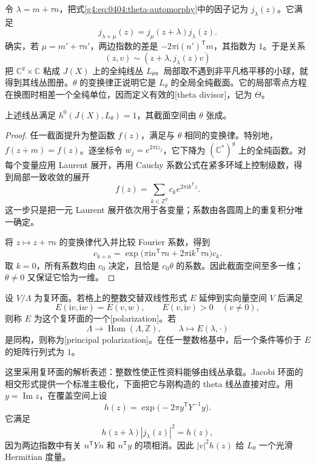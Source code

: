 令 \(\lambda=m+\tau n\)，把式\eqref{g4:eq:0404:theta-automorphy}中的因子记为 \(j_\lambda(z)\)。它满足
\[
	j_{\lambda+\mu}(z)=j_\mu(z+\lambda)j_\lambda(z).
\]
确实，若 \(\mu=m'+\tau n'\)，两边指数的差是 \(-2\pi\mathrm{i}(n')^{\mathsf T}m\)，其指数为 \(1\)。于是关系
\[
	(z,v)\sim(z+\lambda,j_\lambda(z)v)
\]
把 \(\mathbb C^g\times\mathbb C\) 粘成 \(J(X)\) 上的全纯线丛 \(L_\theta\)。局部取不遇到非平凡格平移的小球，就得到其线丛图册。\(\theta\) 的变换律正说明它是 \(L_\theta\) 的全局全纯截面。它的局部零点方程在换图时相差一个全纯单位，因而定义有效的[theta divisor]，记为 \(\Theta\)。

\begin{proposition}
	\label{g4:prop:0404:theta-section-dimension}
	上述线丛满足 \(h^0(J(X),L_\theta)=1\)，其截面空间由 \(\theta\) 张成。
\end{proposition}
\begin{proof}
	任一截面提升为整函数 \(f(z)\)，满足与 \(\theta\) 相同的变换律。特别地，\(f(z+m)=f(z)\)。逐坐标令 \(w_j=e^{2\pi\mathrm{i}z_j}\)，它下降为 \((\mathbb C^*)^g\) 上的全纯函数。对每个变量应用 Laurent 展开，再用 Cauchy 系数公式在紧多环域上控制级数，得到局部一致收敛的展开
	\[
		f(z)=\sum_{k\in\mathbb Z^g}c_k e^{2\pi\mathrm{i}k^{\mathsf T}z}.
	\]
	这一步只是把一元 Laurent 展开依次用于各变量；系数由各圆周上的重复积分唯一确定。

	将 \(z\mapsto z+\tau n\) 的变换律代入并比较 Fourier 系数，得到
	\[
		c_{k+n}=\exp\bigl(\pi\mathrm{i}n^{\mathsf T}\tau n
		+2\pi\mathrm{i}k^{\mathsf T}\tau n\bigr)c_k.
	\]
	取 \(k=0\)，所有系数均由 \(c_0\) 决定，且恰是 \(c_0\theta\) 的系数。因此截面空间至多一维；\(\theta\ne0\) 又保证它恰为一维。
\end{proof}

\begin{definition}
	\label{g4:def:0404:principal-polarization}
	设 \(V/\Lambda\) 为复环面。若格上的整数交替双线性形式 \(E\) 延伸到实向量空间 \(V\) 后满足
	\[
		E(\mathrm{i}v,\mathrm{i}w)=E(v,w),\qquad
		E(v,\mathrm{i}v)>0\quad(v\ne0),
	\]
	则称 \(E\) 为这个复环面的一个[polarization]。若
	\[
		\Lambda\longrightarrow\operatorname{Hom}(\Lambda,\mathbb Z),\qquad
		\lambda\longmapsto E(\lambda,\cdot)
	\]
	是同构，则称为[principal polarization]。在任一整数格基中，后一个条件等价于 \(E\) 的矩阵行列式为 \(1\)。
\end{definition}

这里采用复环面的解析表述：整数性使正性资料能够由线丛承载。Jacobi 环面的相交形式提供一个标准主极化，下面把它与刚构造的 theta 线丛直接对应。用 \(y=\operatorname{Im}z\)，在覆盖空间上设
\[
	h(z)=\exp\bigl(-2\pi y^{\mathsf T}Y^{-1}y\bigr).
\]
它满足
\[
	h(z+\lambda)|j_\lambda(z)|^2=h(z),
\]
因为两边指数中有关 \(n^{\mathsf T}Yn\) 和 \(n^{\mathsf T}y\) 的项相消。因此 \(|v|^2h(z)\) 给 \(L_\theta\) 一个光滑 Hermitian 度量。


